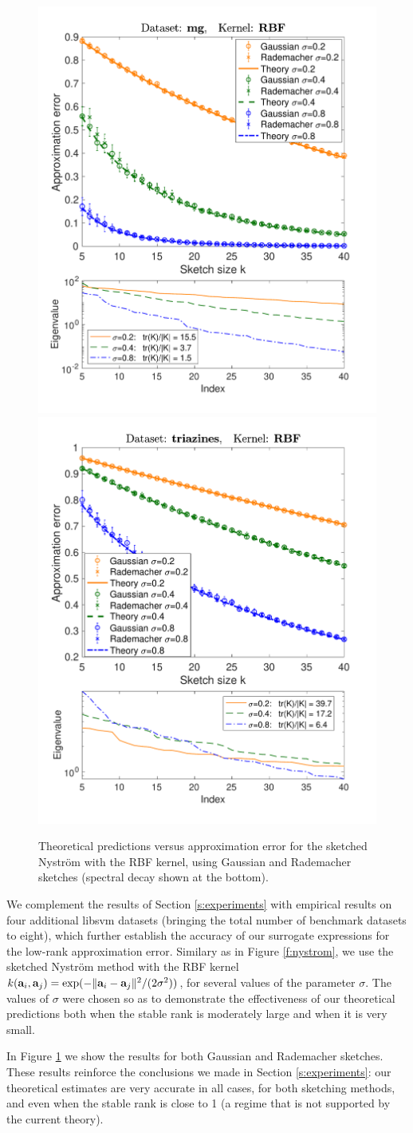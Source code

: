 \documentclass[../../thesis.tex]{subfiles}
\begin{document}
\begin{figure}[htbp]
  \includegraphics[width=.47\textwidth]{mg-supp}\nobreak\includegraphics[width=.47\textwidth]{triazines-supp}
  \caption{Theoretical predictions versus approximation error for the
    sketched Nystr\"om with the RBF kernel, using Gaussian and
    Rademacher sketches (spectral decay shown at the bottom).}\label{f:nystrom2}
\end{figure}


We complement the results of Section \ref{s:experiments} with
empirical results on four additional libsvm datasets \citep{libsvm} (bringing
the total number of benchmark datasets to eight), which further
establish the accuracy of our surrogate expressions for the low-rank approximation
error. Similary as in Figure \ref{f:nystrom}, we use the sketched
Nystr\"om method \citep{revisiting-nystrom} with the RBF kernel
$k(\mathbf a_i,\mathbf a_j)=\exp(-\|\mathbf a_i-\mathbf a_j\|^2/(2\sigma^2))$, for several values
of the parameter $\sigma$. The values of $\sigma$ were chosen so as to
demonstrate the effectiveness of our theoretical predictions both when the
stable rank is moderately large and when it is very small.

In Figure \ref{f:nystrom2} we show the results for both Gaussian and
Rademacher sketches. These results reinforce the conclusions we made in
Section \ref{s:experiments}: our theoretical estimates are very
accurate in all cases, for both sketching methods, and even when the
stable rank is close to 1 (a regime that is not supported by the
current theory).
\end{document}
